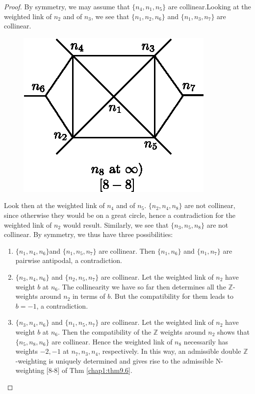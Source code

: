 \begin{proof}
By symmetry, we may assume that $\{ n_4, n_1, n_5 \}$ are
collinear.\break Looking at the weighted link of $n_2$ and of $n_3$, we see
that $\{ n_1, n_2, n_6 \}$ and $\{ n_1, n_3, n_7 \}$ are
collinear.
\begin{figure}[H]
\centering 
\includegraphics{vol58-fig/fig58-50.eps} 
\end{figure}


 Look then at the weighted link of $n_4$ and of $n_5$.  $\{
n_2, n_4, n_8 \}$ are not collinear, since otherwise they would be on
a great circle, hence a contradiction for the weighted link of $n_2$
would result. Similarly, we see that $\{ n_3, n_5, n_8 \}$ are not
collinear. By symmetry,  we thus have three possibilities: 
\begin{enumerate}
\item $\{ n_1, n_4, n_6 \}$\pageoriginale and $\{ n_1, n_5, n_7 \}$
  are collinear. Then $\{ n_1,  n_6 \}$ and $\{ n_1, n_7 \}$ are
  pairwise antipodal, a contradiction.  

\item $\{ n_3, n_4, n_6 \}$ and $\{ n_2, n_5, n_7 \}$ are collinear.
  Let the weighted link of $n_2$ have weight $b$ at $n_6$. The
  collinearity we have so far then determines all the
  $\mathbb{Z}$-weights around $n_2$ in terms of $b$. But the
  compatibility for them leads to $b = -1$, a contradiction. 

\item $\{ n_3, n_4, n_6 \}$ and $\{ n_1, n_5, n_7 \}$ are collinear.
  Let the weighted link of $n_2$ have weight $b$ at $n_6$. Then the
  compatibility of the $\mathbb{Z}$ weights around $n_2$ shows that
  $\{ n_5, n_8, n_6 \}$ are collinear.  Hence the weighted link of
  $n_8$ necessarily has weights $-2, -1$ at $n_7, n_3, n_4$,
  respectively.  In this way, an admissible double $\mathbb{Z}$
  -weighting is uniquely determined and gives rise to the admissible
  N-weighting [8-8] of Thm \ref{chap1:thm9.6}.  
\end{enumerate}
\end{proof}


